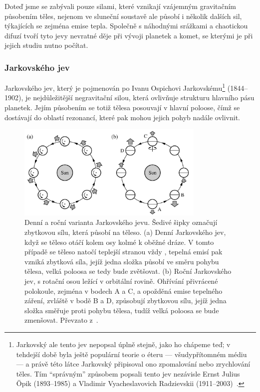 \documentclass[A4paper, 12pt, oneside]{book}
\begin{document}
Doteď jsme se zabývali pouze silami, které vznikají vzájemným gravitačním působením těles, nejenom ve sluneční soustavě ale působí i několik dalších sil, týkajících se zejména emise tepla. Společně s náhodnými srážkami a chaotickou difuzí tvoří tyto jevy nevratné děje při vývoji planetek a komet, se kterými je při jejich studiu nutno počítat.

\subsubsection{Jarkovského jev} \label{sec:jarko}
Jarkovského jev, který je pojmenován po Ivanu Ospichovi Jarkovskému\footnote{Jarkovský ale tento jev nepopsal úplně stejně, jako ho chápeme teď; v tehdejší době byla ještě populární teorie o éteru --- všudypřítomném médiu --- a právě této látce Jarkovský připisoval ono zpomalování nebo zrychlování těles. Tím \enquote{správným} způsobem popsali tento jev nezávisle Ernst Julius Öpik (1893--1985) a Vladimir Vyacheslavovich Radzievskii (1911--2003)~\cite{brozphd}.}  (1844--1902), je nejdůležitější negravitační silou, která ovlivňuje strukturu hlavního pásu planetek. Jejím působením se totiž tělesa posouvají v hlavní poloose, čímž se dostávají do oblastí rezonancí, které pak mohou jejich pohyb nadále ovlivnit.

\begin{figure} 
	\centering

		\includegraphics[width=0.8\textwidth]{obr/jarkovskeho_jev.png}
	\caption{Denní a roční varianta Jarkovského jevu. Šedivé šipky
	označují zbytkovou sílu, která působí na těleso. (a) Denní Jarkovského jev, když se těleso otáčí kolem osy kolmé k oběžné dráze. V tomto případě se těleso natočí teplejší stranou vždy , tepelná emisí pak vzniká zbytková síla, jejíž jedna složka působí ve směru pohybu tělesa, velká poloosa se tedy bude zvětšovat. (b) Roční Jarkovského jev, s rotační osou ležící v orbitální rovině. Ohřívání přivrácené polokoule, zejména v bodech A a C, a opožděná emise tepelného záření, zvláště v bodě B a D, způsobují zbytkovou sílu, jejíž jedna složka směřuje proti pohybu tělesa, tudíž velká poloosa se bude zmenšovat. Převzato z~\cite{fmt}.} \label{fig:jarko}
\end{figure}
\end{document}
